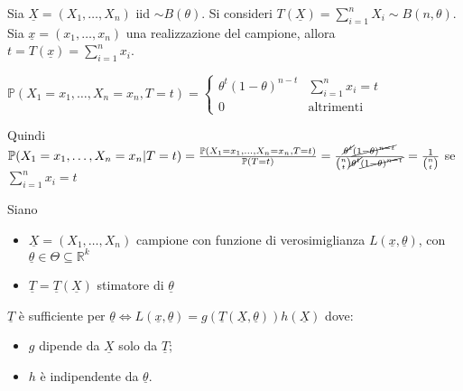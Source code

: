 \documentclass[hidelinks, 10pt]{report}
\begin{document}
\begin{es}
Sia $ \underline{X} = (X_1, \dotsc, X_n) $ iid $ \sim B(\theta) $. Si consideri $ T(\underline{X}) = \sum\limits_{i = 1}^{n} X_i \sim B(n, \theta) $. Sia $ \underline{x} = (x_1, \dotsc, x_n) $ una realizzazione del campione, allora $ t = T(\underline{x}) = \sum\limits_{i = 1}^{n} x_i $.

$ \mathbb{P}(X_1 = x_1, \dotsc, X_n = x_n, T = t) = \begin{cases} \theta^{t} (1 - \theta)^{n - t} & \sum\limits_{i = 1}^{n} x_{i} = t \\ 0 & \text{altrimenti} \end{cases} $

Quindi $ \mathbb{P} (X_1 = x_1, \dotsc, X_n = x_n \vert T = t) = \frac{\mathbb{P}(X_1 = x_1, \dotsc, X_n = x_n, T = t)}{\mathbb{P} (T = t)} = \frac{\cancel{\theta^t} \cancel{(1 - \theta)^{n -t}}}{\binom{n}{t} \cancel{\theta^t} \cancel{(1 - \theta)^{n - t}}} = \frac{1}{\binom{n}{t}} $ se $ \sum\limits_{i = 1}^{n} x_i = t $
\end{es}

\begin{thm}
Siano
\begin{itemize}
\item $ \underline{X} = (X_1, \dotsc, X_n) $ campione con funzione di verosimiglianza $ L(\underline{x}, \underline{\theta}) $, con $ \underline{\theta} \in \Theta \subseteq \mathbb{R}^k $
\item $ \underline{T} = \underline{T}(\underline{X}) $ stimatore di $ \underline{\theta} $
\end{itemize}

$ \underline{T} $ \`e sufficiente per $ \underline{\theta} \iff L(\underline{x}, \underline{\theta}) = g(\underline{T}(\underline{X}, \underline{\theta})) h(\underline{X}) $ dove:
\begin{itemize}
\item $ g $ dipende da $ \underline{X} $ solo da $ \underline{T} $;
\item $ h $ \`e indipendente da $ \underline{\theta} $. 
\end{itemize}
\end{thm}
\end{document}

